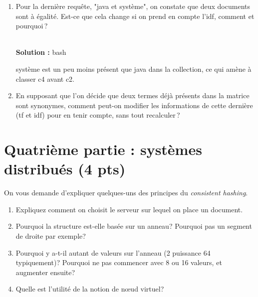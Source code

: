 \documentclass[11pt,a4paper]{article}
\newenvironment{solution}[0]{
~\\ \color{red} \textbf{Solution : }\color{black}}{%
}
\begin{document}
\begin{enumerate}
\begin{solution}
\begin{itemize}
  \item système\,: c1 : $\frac{1}{\sqrt{2}}$;  
       c4 : $\frac{1}{\sqrt{3}}$; 
       c5 : $\frac{2}{\sqrt{6}}$; 
  
  \item nosql et analyse\,: 
  
    c2 : $\frac{1+1}{\sqrt{3}}$; 
    c4 :  $\frac{1+1}{\sqrt{3}}$  
    c5 : $\frac{1}{\sqrt{6}}$; 

  \item java et système
  
    c1 : $\frac{1+1}{\sqrt{2}}$; 
    c2 : $\frac{1}{\sqrt{3}}$;
    c3 :  $\frac{2}{\sqrt{3}}$  
    c4 :  $\frac{1}{\sqrt{3}}$  
    c5 : $\frac{1+2}{\sqrt{6}}$; 
    
 \end{itemize}

\end{solution}  

   \item Pour la dernière requête, "java et système", on constate que deux
     documents sont à égalité. Est-ce que cela change 
   si on prend en compte l'idf, comment et pourquoi\,?
   
\begin{solution}
bash

système est un peu moins présent que java dans la collection, ce qui amène à classer
c4 avant c2.
\end{solution}

\item En supposant que l'on décide que deux
   termes déjà présents dans la matrice sont synonymes, comment peut-on modifier
    les informations de cette dernière (tf et idf) pour en tenir compte, sans tout recalculer\,?

\end{enumerate}


\section*{Quatrième partie : systèmes distribués (4 pts)}

On vous demande d'expliquer quelques-uns des principes du \textit{consistent hashing}. 

\begin{enumerate}
   \item Expliquez comment on choisit le serveur sur lequel on place un document.
  \item Pourquoi la structure est-elle basée sur un anneau? Pourquoi pas un segment de droite par exemple?
  \item Pourquoi y a-t-il autant de valeurs sur l'anneau (2 puissance 64 typiquement)? Pourquoi ne pas commencer
      avec 8 ou 16 valeurs, et augmenter ensuite?
   \item Quelle est l'utilité de la notion de n{\oe}ud virtuel?
\end{enumerate}
\end{document}
